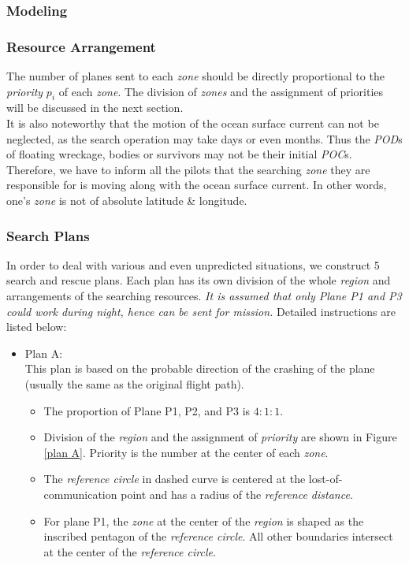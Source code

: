 \documentclass[a4paper,11pt]{article}
\begin{document}
\begin{spacing}{1.0}
\begin{enumerate}
	
\end{enumerate}

\subsubsection{Modeling}
\subsubsection*{Resource Arrangement}
The number of planes sent to each \textit{zone} should be directly proportional to the \textit{priority} $p_i$ of each \textit{zone}. The division of \textit{zones} and the assignment of priorities will be discussed in the next section.
\\It is also noteworthy that the motion of the ocean surface current can not be neglected, as the search operation may take days or even months. Thus the \textit{POD}s of floating wreckage, bodies or survivors may not be their initial {\it POC}s. Therefore, we have to inform all the pilots that the searching \textit{zone} they are responsible for is moving along with the ocean surface current. In other words, one's \textit{zone} is not of absolute latitude \& longitude.



\subsubsection*{Search Plans}
In order to deal with various and even unpredicted situations, we construct 5 search and rescue plans. Each plan has its own division of the whole \textit{region} and arrangements of the searching resources. {\it It is assumed that only Plane P1 and P3 could work during night, hence can be sent for mission.} Detailed instructions are listed below:
\begin{itemize}
	\item Plan A: 
	\\This plan is based on the probable direction of the crashing of the plane (usually the same as the original flight path). 
	\begin{itemize}
		\item The proportion of Plane P1, P2, and P3 is $4:1:1$. 
		\item Division of the \textit{region} and the assignment of \textit{priority} are shown in Figure \ref{plan A}. Priority is the number at the center of each \textit{zone}.
		\item The \textit{reference circle} in dashed curve is centered at the lost-of-communication point and has a radius of the \textit{reference distance}. 
		\item For plane P1, the \textit{zone} at the center of the \textit{region} is shaped as the inscribed pentagon of the \textit{reference circle}. All other boundaries intersect at the center of the \textit{reference circle}.
		

\end{itemize}
\end{itemize}
\end{spacing}
\end{document}
